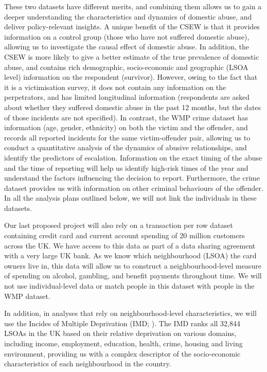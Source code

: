 \documentclass[11pt, a4paper]{article}
\begin{document}
These two datasets have different merits, and combining them allows us to gain a deeper understanding the characteristics and dynamics of domestic abuse, and deliver policy-relevant insights. A unique benefit of the CSEW is that it provides information on a control group (those who have not suffered domestic abuse),  allowing us to investigate the causal effect of domestic abuse. In addition, the CSEW is more likely to give a better estimate of the true prevalence of domestic abuse, and contains rich demographic, socio-economic and geographic (LSOA level) information on the respondent (survivor). However, owing to the fact that it is a victimisation survey, it does not contain any information on the perpetrators, and has limited longitudinal information (respondents are asked about whether they suffered domestic abuse in the past 12 months, but the dates of those incidents are not specified). In contrast, the WMP crime dataset has information (age, gender, ethnicity) on both the victim and the offender, and records all reported incidents for the same victim-offender pair, allowing us to conduct a quantitative analysis of the dynamics of abusive relationships, and identify the predictors of escalation. Information on the exact timing of the abuse and the time of reporting will help us identify high-risk times of the year and understand the factors influencing the decision to report. Furthermore, the crime dataset provides us with information on other criminal behaviours of the offender. In all the analysis plans outlined below, we will not link the individuals in these datasets.


Our last proposed project will also rely on a transaction per row dataset containing credit card and current account spending of 20 million customers across the UK. We have access to this data as part of a data sharing agreement with a very large UK bank. As we know which neighbourhood (LSOA) the card owners live in, this data will allow us to construct a neighbourhood-level measure of spending on alcohol, gambling, and benefit payments throughout time. We will not use individual-level data or match people in this dataset with people in the WMP dataset. 


In addition, in analyses that rely on neighbourhood-level characteristics, we will use the Incides of Multiple Deprivation (IMD; ). The IMD ranks all 32,844 LSOAs in the UK based on their relative deprivation on various domains, including income, employment, education, health, crime, housing and living environment, providing us with a complex descriptor of the socio-economic characteristics of each neighbourhood in the country.  
\end{document}
